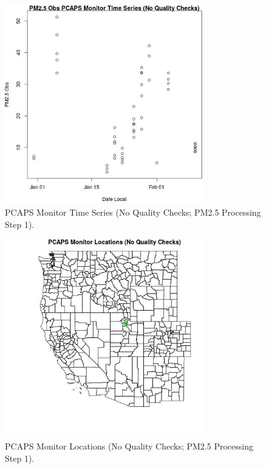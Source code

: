 
\begin{figure} 
\centering  
\includegraphics[width=0.77\textwidth]{Code_Outputs/PM25Source4TSstep1_PM25_ObsvDate_Local.jpg} 
\caption{\label{fig:PM25Source4TSstep1PM25_ObsvDate_Local}PCAPS Monitor Time Series (No Quality Checks; PM2.5 Processing Step 1).} 
\end{figure} 
 

\begin{figure} 
\centering  
\includegraphics[width=0.77\textwidth]{Code_Outputs/PM25Source4TSstep1_MapPCAPSLocations.jpg} 
\caption{\label{fig:PM25Source4TSstep1MapPCAPSLocations}PCAPS Monitor Locations (No Quality Checks; PM2.5 Processing Step 1).} 
\end{figure} 
 
